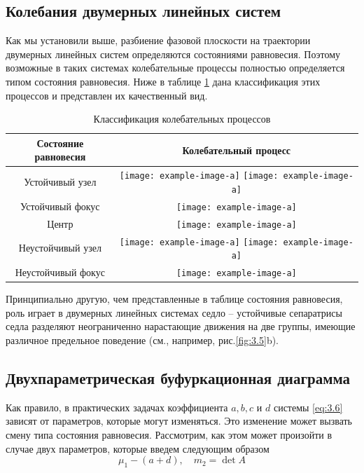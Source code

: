 \subsection{Колебания двумерных линейных систем}%
\label{ssub:3.2.3}

Как мы установили выше, разбиение фазовой плоскости на траектории
двумерных линейных систем определяются состояниями равновесия. Поэтому
возможные в таких системах колебательные процессы полностью определяется
типом состояния равновесия. Ниже в таблице \ref{tab:1} дана классификация этих
процессов и представлен их качественный вид.
\begin{table}[h!]
        \centering
        \caption{Классификация колебательных процессов}
        \label{tab:1}
        \begin{tabular}{|c|c|}
                \hline
            Состояние равновесия  & Колебательный процесс \\ \hline
            Устойчивый узел       & 
            \texttt{[image: example-image-a]}
            \texttt{[image: example-image-a]}\\ \hline
            Устойчивый фокус     & 
            \texttt{[image: example-image-a]}\\ \hline
            Центр                &
            \texttt{[image: example-image-a]} \\ \hline
            Неустойчивый узел    &
            \texttt{[image: example-image-a]}
            \texttt{[image: example-image-a]}\\ \hline
            Неустойчивый фокус   &
            \texttt{[image: example-image-a]} \\ \hline
        \end{tabular}
\end{table}
Принципиально другую, чем представленные в таблице состояния равновесия,
роль играет в двумерных линейных системах седло – устойчивые сепаратрисы
седла разделяют неограниченно нарастающие движения на две группы,
имеющие различное предельное поведение (см., например, рис.\ref{fig:3.5}b). 

\subsection{Двухпараметрическая буфуркационная диаграмма}%
\label{ssub:3.2.4}

Как правило, в практических задачах коэффициента $a, b ,c$ и $d$ системы
\eqref{eq:3.6} зависят от параметров, которые могут изменяться. Это изменение может вызвать смену типа состояния равновесия. Рассмотрим, как этом может произойти в случае двух параметров, которые введем следующим образом
\begin{equation}
        \label{eq:}
        \mu_1 - (a+d), \quad m_2= \det A
\end{equation}

